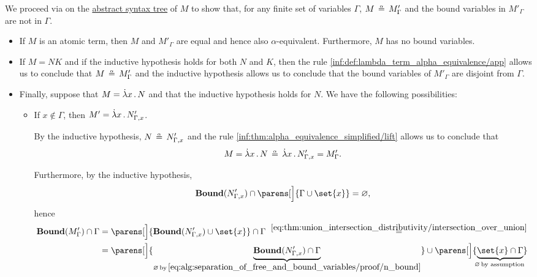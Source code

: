 \begin{defproof}
  We proceed via  on the \hyperref[def:lambda_term_ast]{abstract syntax tree} of \( M \) to show that, for any finite set of variables \( \Gamma \), \( M \aequiv M'_\Gamma \) and the bound variables in \( M'_\Gamma \) are not in \( \Gamma \).

  \begin{itemize}
    \item If \( M \) is an atomic term, then \( M \) and \( M'_\Gamma \) are equal and hence also \( \alpha \)-equivalent. Furthermore, \( M \) has no bound variables.

    \item If \( M = NK \) and if the inductive hypothesis holds for both \( N \) and \( K \), then the rule \ref{inf:def:lambda_term_alpha_equivalence/app} allows us to conclude that \( M \aequiv M'_\Gamma \) and the inductive hypothesis allows us to conclude that the bound variables of \( M'_\Gamma \) are disjoint from \( \Gamma \).

    \item Finally, suppose that \( M = \qabs x N \) and that the inductive hypothesis holds for \( N \). We have the following possibilities:
    \begin{itemize}
      \item If \( x \not\in \Gamma \), then \( M' = \qabs x N'_{\Gamma,x} \).

      By the inductive hypothesis, \( N \aequiv N'_{\Gamma,x} \) and the rule \ref{inf:thm:alpha_equivalence_simplified/lift} allows us to conclude that
      \begin{equation*}
        M = \qabs x N \aequiv \qabs x N'_{\Gamma,x} = M'_\Gamma.
      \end{equation*}

      Furthermore, by the inductive hypothesis,
      \begin{equation}\label{eq:alg:separation_of_free_and_bound_variables/proof/n_bound}
        \op*{Bound}(N'_{\Gamma,x}) \cap \parens[\Big]{ \Gamma \cup \set{ x } } = \varnothing,
      \end{equation}
      hence
      \begin{align*}
        \op*{Bound}(M'_\Gamma) \cap \Gamma
        &=
        \parens[\Big]{ \op*{Bound}(N'_{\Gamma,x}) \cup \set{ x } } \cap \Gamma
        \reloset {\eqref{eq:thm:union_intersection_distributivity/intersection_over_union}} = \\ &=
        \parens[\Big]{ \underbrace{\op*{Bound}(N'_{\Gamma,x}) \cap \Gamma }_{\varnothing \T*{by} \eqref{eq:alg:separation_of_free_and_bound_variables/proof/n_bound}} } \cup \parens[\Big]{ \underbrace{\set{ x } \cap \Gamma}_{\mathclap{\varnothing \T*{by assumption}}} }
      \end{align*}


\end{itemize}
\end{itemize}
\end{defproof}
